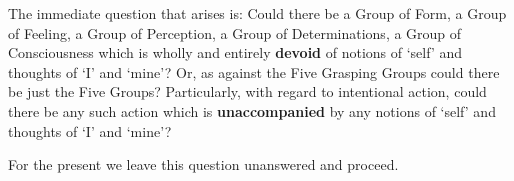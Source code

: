 The immediate question that arises is: Could there be a Group of Form, a Group of Feeling, a Group of Perception, a Group of Determinations, a Group of Consciousness which is wholly and entirely \textbf{devoid} of notions of `self' and thoughts of `I' and `mine'? Or, as against the Five Grasping Groups could there be just the Five Groups? Particularly, with regard to intentional action, could there be any such action which is \textbf{unaccompanied} by any notions of `self' and thoughts of `I' and `mine'?

For the present we leave this question unanswered and proceed.
